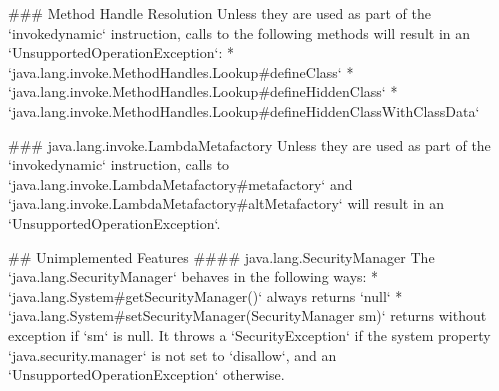 ### Method Handle Resolution
Unless they are used as part of the `invokedynamic` instruction, calls to the following methods 
will result in an `UnsupportedOperationException`:
* `java.lang.invoke.MethodHandles.Lookup#defineClass`
* `java.lang.invoke.MethodHandles.Lookup#defineHiddenClass`
* `java.lang.invoke.MethodHandles.Lookup#defineHiddenClassWithClassData`

### java.lang.invoke.LambdaMetafactory
Unless they are used as part of the `invokedynamic` instruction, calls to `java.lang.invoke.LambdaMetafactory#metafactory` 
and `java.lang.invoke.LambdaMetafactory#altMetafactory` will result in an `UnsupportedOperationException`.


## Unimplemented Features
#### java.lang.SecurityManager
The `java.lang.SecurityManager` behaves in the following ways:
* `java.lang.System#getSecurityManager()` always returns `null`
* `java.lang.System#setSecurityManager(SecurityManager sm)` returns without exception if `sm` is null. 
It throws a `SecurityException` if the system property `java.security.manager` is not set to `disallow`, and an 
`UnsupportedOperationException` otherwise.





